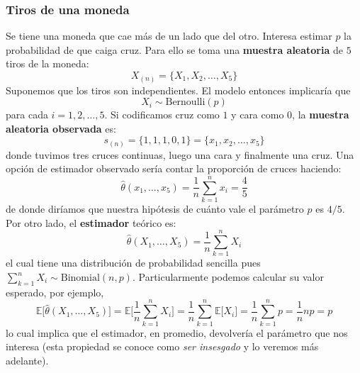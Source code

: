 \documentclass[
]{book}
\newenvironment{Ejemplo}
{\begin{mdframed}[
  linecolor=ejemplocolor,
  skipabove=12pt,
  skipbelow=12pt,
  roundcorner=20pt,
  splittopskip=2\topsep]}
{\end{mdframed}}
\begin{document}
\begin{Ejemplo}
\hypertarget{tiros-de-una-moneda}{%
\subsubsection{Tiros de una moneda}\label{tiros-de-una-moneda}}

Se tiene una moneda que cae más de un lado que del otro. Interesa
estimar \(p\) la probabilidad de que caiga cruz. Para ello se toma una
\textbf{muestra aleatoria} de \(5\) tiros de la moneda: \[
X_{(n)} = \{X_1, X_2, \dots, X_{5} \}
\] Suponemos que los tiros son independientes. El modelo entonces
implicaría que \[
X_i \sim \text{Bernoulli}(p)
\] para cada \(i = 1, 2, \dots, 5\). Si codificamos cruz como \(1\) y
cara como \(0\), la \textbf{muestra aleatoria observada} es: \[
s_{(n)} = \{1,1,1,0,1\} = \{x_1, x_2, \dots, x_5\}
\] donde tuvimos tres cruces continuas, luego una cara y finalmente una
cruz. Una opción de estimador observado sería contar la proporción de
cruces haciendo: \[
\hat{\theta}(x_1, \dots, x_5) = \frac{1}{n} \sum_{k = 1}^n x_i = \frac{4}{5}
\] de donde diríamos que nuestra hipótesis de cuánto vale el parámetro
\(p\) es \(4/5\). Por otro lado, el \textbf{estimador} teórico es: \[
\hat{\theta}(X_1, \dots, X_5) = \frac{1}{n} \sum_{k = 1}^n X_i 
\] el cual tiene una distribución de probabilidad sencilla pues
\(\sum_{k = 1}^n X_i \sim \textrm{Binomial}(n,p)\). Particularmente
podemos calcular su valor esperado, por ejemplo, \[
\mathbb{E}\Big[  \hat{\theta}(X_1, \dots, X_5) \Big]  =  \mathbb{E}\Big[  \frac{1}{n} \sum_{k = 1}^n X_i  \Big] = \frac{1}{n}\sum_{k = 1}^n \mathbb{E}\Big[X_i \Big] = \frac{1}{n}\sum_{k = 1}^n  p = \frac{1}{n} np = p
\] lo cual implica que el estimador, en promedio, devolvería el
parámetro que nos interesa (esta propiedad se conoce como \emph{ser
insesgado} y lo veremos más adelante).
\end{Ejemplo}
\end{document}
